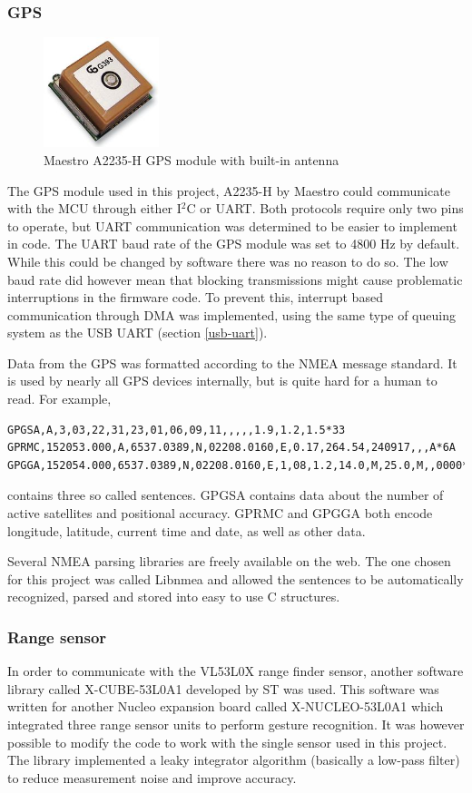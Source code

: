 \subsubsection{GPS}
\begin{figure}[H]
\centering
\includegraphics[width=0.3\textwidth]{Figures/A2235-H.jpg}
\caption{Maestro A2235-H GPS module with built-in antenna}
\label{gps-figure}
\end{figure}
The GPS module used in this project, A2235-H by Maestro \cite{gps} could communicate with the MCU through either I$^2$C or UART. Both protocols require only two pins to operate, but UART communication was determined to be easier to implement in code. The UART baud rate of the GPS module was set to 4800 Hz by default. While this could be changed by software there was no reason to do so. The low baud rate did however mean that blocking transmissions might cause problematic interruptions in the firmware code. To prevent this, interrupt based communication through DMA was implemented, using the same type of queuing system as the USB UART (section \ref{usb-uart}).

Data from the GPS was formatted according to the NMEA message standard. It is used by nearly all GPS devices internally, but is quite hard for a human to read. For example,
\begin{lstlisting}
GPGSA,A,3,03,22,31,23,01,06,09,11,,,,,1.9,1.2,1.5*33
GPRMC,152053.000,A,6537.0389,N,02208.0160,E,0.17,264.54,240917,,,A*6A
GPGGA,152054.000,6537.0389,N,02208.0160,E,1,08,1.2,14.0,M,25.0,M,,0000*68
\end{lstlisting}
contains three so called sentences. GPGSA contains data about the number of active satellites and positional accuracy. GPRMC and GPGGA both encode longitude, latitude, current time and date, as well as other data.

Several NMEA parsing libraries are freely available on the web. The one chosen for this project was called Libnmea \cite{libnmea} and allowed the sentences to be automatically recognized, parsed and stored into easy to use C structures.


\subsubsection{Range sensor}
In order to communicate with the VL53L0X range finder sensor, another software library called X-CUBE-53L0A1 \cite{x-cube-53l0a} developed by ST was used. This software was written for another Nucleo expansion board called X-NUCLEO-53L0A1 which integrated three range sensor units to perform gesture recognition. It was however possible to modify the code to work with the single sensor used in this project. The library implemented a leaky integrator algorithm (basically a low-pass filter) to reduce measurement noise and improve accuracy.

